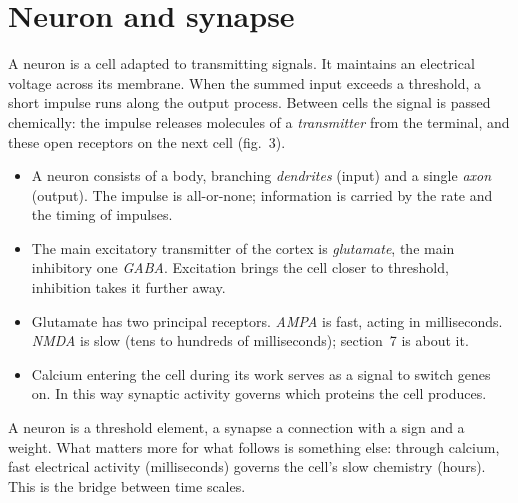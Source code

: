\section{Neuron and synapse}
A neuron is a cell adapted to transmitting signals. It maintains an electrical voltage across its membrane. When the summed input exceeds a threshold, a short impulse runs along the output process. Between cells the signal is passed chemically: the impulse releases molecules of a \emph{transmitter} from the terminal, and these open receptors on the next cell (fig.~3).
\facts
\begin{itemize}
\item A neuron consists of a body, branching \emph{dendrites} (input) and a single \emph{axon} (output). The impulse is all-or-none; information is carried by the rate and the timing of impulses.\tU
\item The main excitatory transmitter of the cortex is \emph{glutamate}, the main inhibitory one \emph{GABA}. Excitation brings the cell closer to threshold, inhibition takes it further away.\tU
\item Glutamate has two principal receptors. \emph{AMPA} is fast, acting in milliseconds. \emph{NMDA} is slow (tens to hundreds of milliseconds); section~7 is about it.\tU
\item Calcium entering the cell during its work serves as a signal to switch genes on. In this way synaptic activity governs which proteins the cell produces.\tU
\end{itemize}
\begin{ineq}
A neuron is a threshold element, a synapse a connection with a sign and a weight. What matters more for what follows is something else: through calcium, fast electrical activity (milliseconds) governs the cell's slow chemistry (hours). This is the bridge between time scales.
\end{ineq}
